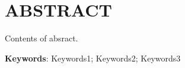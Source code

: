 \chapter{ABSTRACT}  %

Contents of absract.

\vspace{1cm}

\textbf{Keywords}: Keywords1; Keywords2; Keywords3

